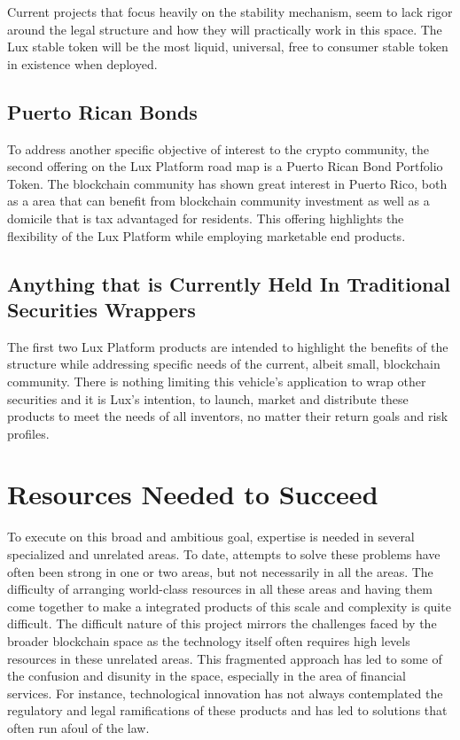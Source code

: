 \documentclass[11pt]{article}
\begin{document}
Current projects that focus heavily on the stability mechanism, seem to lack rigor around the legal structure and how they will practically work in this space. The Lux stable token will be the most liquid, universal, free to consumer stable token in existence when deployed.


\subsection{Puerto Rican Bonds}

To address another specific objective of interest to the crypto community, the second offering on the Lux Platform road map is a Puerto Rican Bond Portfolio Token. The blockchain community has shown great interest in Puerto Rico, both as a  area that can benefit from blockchain community investment as well as a domicile that is tax advantaged for residents. This offering highlights the flexibility of the Lux Platform while employing marketable end products.


\subsection{Anything that is Currently Held In Traditional Securities Wrappers}

The first two Lux Platform products are intended to highlight the benefits of the structure while addressing specific needs of the current, albeit small, blockchain community. There is nothing limiting this vehicle's application to wrap other securities and it is Lux's intention, to launch, market and distribute these products to meet the needs of all inventors, no matter their return goals and risk profiles.


\section{Resources Needed to Succeed}

To execute on this broad and ambitious goal, expertise is needed in several specialized and unrelated areas. To date, attempts to solve these problems have often been strong in one or two areas, but not necessarily in all the areas. The difficulty of arranging world-class resources in all these areas and having them come together to make a integrated products of this scale and complexity is quite difficult. The difficult nature of this project mirrors the challenges faced by the broader blockchain space as the technology itself often requires high levels resources in these unrelated areas. This fragmented approach has led to some of the confusion and disunity in the space, especially in the area of financial services. For instance, technological innovation has not always contemplated the regulatory and legal ramifications of these products and has led to solutions that often run afoul of the law.
\end{document}

